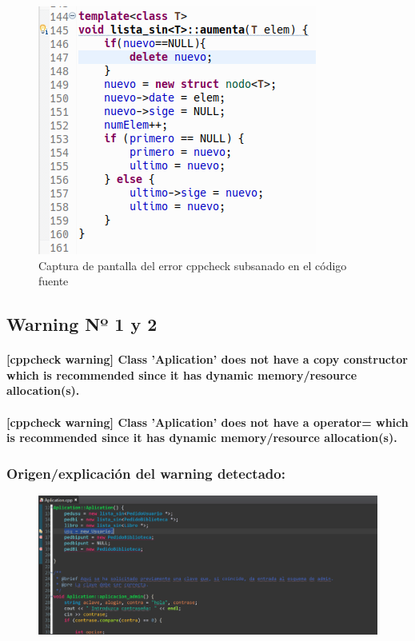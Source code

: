 			\begin{figure}[H]
				\centering
				\includegraphics[scale=0.55]{img/captura93.png}
				\caption{Captura de pantalla del error cppcheck subsanado en el código fuente}
				\label{captura9}
			\end{figure}
		
	\subsection{Warning Nº 1 y 2}
	
		\paragraph{[cppcheck warning] Class 'Aplication' does not have a copy constructor which is recommended since it has dynamic memory/resource allocation(s).}
		
		\paragraph{[cppcheck warning] Class 'Aplication' does not have a operator= which is recommended since it has dynamic memory/resource allocation(s).}
	
		\subsubsection{Origen/explicación del warning detectado:}
		
			\begin{figure}[H]
				\centering
				\includegraphics[scale=0.55]{img/esteban1.png}
				\label{esteban1}
			\end{figure}
		
